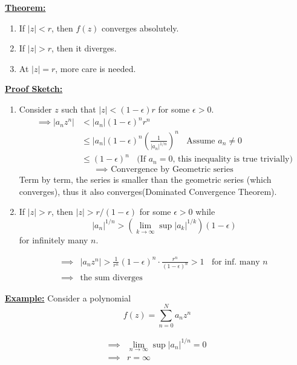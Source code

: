 \documentclass{article}
\begin{document}
\begin{dottedbox}
  \underline{\textbf{Theorem:}} 
  \begin{enumerate}
    \item If $|z| < r$, then $f(z)$ converges absolutely.
    \item If $|z| > r$, then it diverges.
    \item At $|z| = r$, more care is needed.
  \end{enumerate}

  \vskip 0.5cm
  \underline{\textbf{Proof Sketch:}} 
  \begin{enumerate}
    \item Consider $z$ such that $|z| < (1 - \epsilon)r$ for some $\epsilon > 0$.
    \begin{align*}
      \implies |a_n z^n| &< |a_n|(1-\epsilon)^n r^n \\
      &\leq |a_n| (1-\epsilon)^n \left(\frac{1}{|a_n|^{1/n}}\right)^n \;\;\text{ Assume $a_n \neq 0$}\\
      &\leq (1-\epsilon)^n \;\;\text{ (If $a_n = 0$, this  inequality is true trivially)}
    \end{align*}
    \[ \implies \text{ Convergence by Geometric series} \]
    Term by term, the series is smaller than the geometric series (which converges), thus it also converges(Dominated Convergence Theorem).

    \vskip 0.5cm
    \item If $|z| > r$, then $|z| > r/(1 - \epsilon)$ for some $\epsilon > 0$ while 
    \[ |a_n|^{1/n} > \left( \lim_{k \rightarrow \infty} \sup |a_k|^{1/k} \right) (1 - \epsilon) \] for infinitely many $n$.

    \begin{align*}
      \implies &|a_n z^n| > \frac{1}{r^n}(1-\epsilon)^n \cdot \frac{r^n}{(1-\epsilon)^n} > 1 \;\;\text{ for inf. many $n$} \\
      \implies &\text{the sum diverges}
    \end{align*}
  \end{enumerate}

\end{dottedbox}

\vskip 0.5cm
\underline{\textbf{Example:}} Consider a polynomial 
\[ f(z) = \sum_{n = 0}^{N} a_n z^n \]

\begin{align*}
  \implies &\lim_{n \rightarrow \infty} \sup |a_n|^{1/n} = 0 \\
  \implies & r = \infty
\end{align*}
\end{document}
